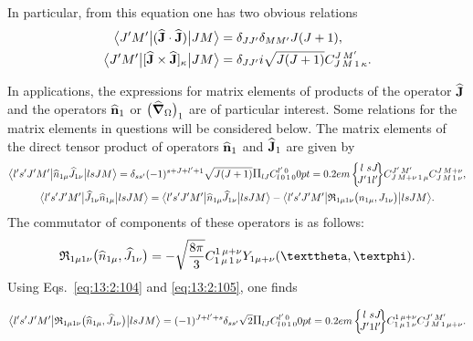 In particular, from this equation one has two obvious relations
\begin{align*}
\bigl\langle  J^{\prime} M^{\prime} \big|  (\widehat{\mathbf{J}} \cdot \widehat{\mathbf{J}}) \big| J M \bigr\rangle & =\delta_{J J^{\prime}} \delta_{M M^{\prime}} J(J+1), \\
\bigl\langle  J^{\prime} M^{\prime} \big| [\widehat{\mathbf{J}} \times \widehat{\mathbf{J}}]_{\kappa} \big| J M \bigr\rangle & =\delta_{J J^{\prime}} i \sqrt{J(J+1)} C_{J\,M\,1\,\kappa}^{J\,M^{\prime}}.
\end{align*}

In applications, the expressions for matrix elements of products of the operator \(\widehat{\mathbf{J}}\) and the operators \(\widehat{\mathbf{n}}_{1}\) or \(\bigl(\widehat{\boldsymbol{\nabla}}_{\Omega}\bigr)_{1}\) are of particular interest. Some relations for the matrix elements in questions will be considered below. The matrix elements of the direct tensor product of operators \(\widehat{\mathbf{n}}_{1}\) and \(\widehat{\mathbf{J}}_{1}\) are given by
\begin{gather}
\braOket{ l^{\prime} s^{\prime} J^{\prime} M^{\prime}}{ \widehat{n}_{1 \mu} \widehat{J}_{1 \nu}}{l s J M}=\delta_{s s^{\prime}}(-1)^{s+J+l^{\prime}+1} \sqrt{J(J+1)}\Fact{l J}
\clebsch{l}{0}{1}{0}{l^{\prime}}{0}
\sixj{l}{s}{J}{J^{\prime}}{1}{l^{\prime}} 
\clebsch{J}{M+\nu}{1}{\mu}{J^{\prime}}{M^{\prime}} 
\clebsch{J}{M}{1}{\nu}{J}{M+\nu},  \label{eq:13:2:48}\\
\braOket{ l^{\prime} s^{\prime} J^{\prime} M^{\prime}}{ \widehat{J}_{1 \nu} \widehat{n}_{1 \mu}}{l s J M}=
\braOket{ l^{\prime} s^{\prime} J^{\prime} M^{\prime}}{ \widehat{n}_{1 \mu} \widehat{J}_{1 \nu}}{l s J M}-
\braOket{ l^{\prime} s^{\prime} J^{\prime} M^{\prime}}{ \mathfrak{R}_{1 \mu 1 \nu}\bigl(n_{1 \mu}, J_{1 \nu}\bigr)}{l s J M}. \label{eq:13:2:49}
\end{gather}
The commutator of components of these operators is as follows:
\begin{equation}
\mathfrak{R}_{1 \mu 1 \nu}\bigl(\widehat{n}_{1 \mu}, \widehat{J}_{1 \nu}\bigr)=-\sqrt{\frac{8 \pi}{3}} 
\clebsch{1}{\mu}{1}{\nu}{1}{\mu+\nu} Y_{1 \mu+\nu}(\vartheta, \varphi). \label{eq:13:2:50}
\end{equation}
Using Eqs.~\eqref{eq:13:2:104} and \eqref{eq:13:2:105}, one finds

\begin{equation}
\braOket{ l^{\prime} s^{\prime} J^{\prime} M^{\prime}}{ \mathfrak{R}_{1 \mu 1 \nu}\bigl(\widehat{n}_{1 \mu}, \widehat{J}_{1 \nu}\bigr)}{l s J M}=(-1)^{J+l^{\prime}+s} \delta_{s s^{\prime}} \sqrt{2}\Fact{l J}
\clebsch{l}{0}{1}{0}{l^{\prime}}{0}
\sixj{l}{s}{J}{J^{\prime}}{1}{l^{\prime}} 
\clebsch{1}{\mu}{1}{\nu}{1}{\mu+\nu} 
\clebsch{J}{M}{1}{\mu+\nu}{J^{\prime}}{M^{\prime}}. \label{eq:13:2:51} 
\end{equation}

